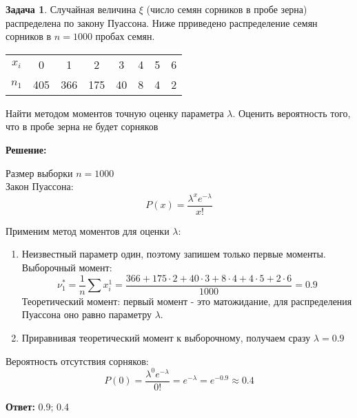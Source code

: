 \documentclass[a4paper,11pt]{article}
\theoremstyle{definition}
\newtheorem{problem}{Задача}\setlength{\parindent}{0pt}
\newenvironment{solution}
{\begin{shaded}\textbf{Решение:}\par\setlength{\parindent}{0pt}}
{\end{shaded}}
\newenvironment{answer}
{\par\noindent\textbf{Ответ:}}
{\par}
\begin{document}
\vspace{8pt}
\begin{problem}
    Случайная величина \( \xi \) (число семян сорников в пробе зерна) распределена по закону Пуассона.
    Ниже прриведено распределение семян сорников в \( n = 1000 \) пробах семян. 

    \begin{table}[H]
        \centering
        \begin{adjustbox}{max width=\textwidth}
            \begin{tabular}{c c c c c c c c}
                \toprule
                \midrule
                    \(x_i\) & 0   & 1   & 2   & 3  & 4 & 5 & 6 \\
                    \(n_1\) & 405 & 366 & 175 & 40 & 8 & 4 & 2 \\
            \bottomrule
            \end{tabular}
        \end{adjustbox}
    \end{table}  

    Найти методом моментов точную оценку параметра \( \lambda \). 
    Оценить вероятность того, что в пробе зерна не будет сорняков 

    \begin{solution}
        Размер выборки \(n = 1000\)\\
        Закон Пуассона: 
        \[ P(x) = \frac{\lambda^x e^{-\lambda}}{x!} \]

        Применим метод моментов для оценки \(\lambda\):
        \begin{enumerate}
            \item Неизвестный параметр один, поэтому запишем только первые моменты.\\
                  Выборочный момент:
                  \[\nu^{*}_1 = \frac{1}{n}\sum x_i^1 = \frac{366+175\cdot2+40\cdot3+8\cdot4+4\cdot5+2\cdot6}{1000} = 0.9\]
                  Теоретический момент: 
                  первый момент - это матожидание, для распределения Пуассона оно равно параметру \(\lambda\).

            \item Приравнивая теоретический момент к выборочному, получаем сразу \(\lambda = 0.9\)
        \end{enumerate}

        Вероятность отсутствия сорняков:
        \[P(0) = \frac{\lambda^0 e^{-\lambda}}{0!} = e^{-\lambda} = e^{-0.9} \approx 0.4\]
    \end{solution}

    \begin{answer}
        0.9; 0.4
    \end{answer}

\end{problem}
\end{document}
